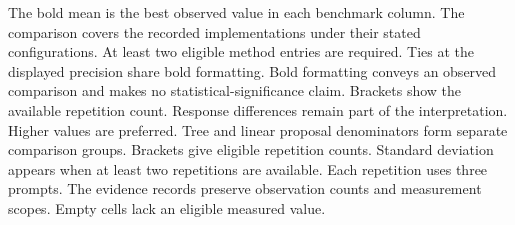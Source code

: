 \begin{table}[!htp]
\begin{minipage}{\linewidth}
The bold mean is the best observed value in each benchmark column. The comparison covers the recorded implementations under their stated configurations. At least two eligible method entries are required. Ties at the displayed precision share bold formatting. Bold formatting conveys an observed comparison and makes no statistical-significance claim. Brackets show the available repetition count. Response differences remain part of the interpretation. Higher values are preferred. Tree and linear proposal denominators form separate comparison groups.
Brackets give eligible repetition counts. Standard deviation appears when at least two repetitions are available. Each repetition uses three prompts. The evidence records preserve observation counts and measurement scopes. Empty cells lack an eligible measured value.
\end{minipage}
\end{table}

